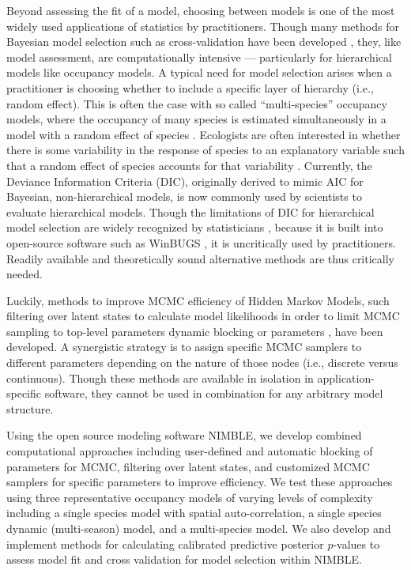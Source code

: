 \documentclass[12pt]{article}
\begin{document}
Beyond assessing the fit of a model, choosing between models is one of
the most widely used applications of statistics by
practitioners. Though many methods for Bayesian model selection such
as cross-validation have been developed \citep{hooten2014guide}, they,
like model assessment, are computationally intensive --- particularly
for hierarchical models like occupancy models. A typical need for
model selection arises when a practitioner is choosing whether to
include a specific layer of hierarchy (i.e., random effect). This is
often the case with so called ``multi-species'' occupancy models,
where the occupancy of many species is estimated simultaneously in a
model with a random effect of species \citep[reviewed in,
][]{iknayan2014detecting}. Ecologists are often interested in whether
there is some variability in the response of species to an explanatory
variable such that a random effect of species accounts for that
variability \citep{pacifici2014guidelines}. Currently, the Deviance
Information Criteria (DIC), originally derived to mimic AIC for
Bayesian, non-hierarchical models, is now commonly used by scientists
to evaluate hierarchical models. Though the limitations of DIC for
hierarchical model selection are widely recognized by statisticians
\citep{celeux2006deviance, hooten2014guide}, because it is built into
open-source software such as WinBUGS \citep{winbugs}, it is
uncritically used by practitioners. Readily available and
theoretically sound alternative methods are thus critically needed.

Luckily, methods to improve MCMC efficiency of Hidden Markov Models,
such filtering over latent states to calculate model likelihoods
in order to limit MCMC sampling to top-level parameters dynamic
blocking or parameters \citep{turek2016efficient}, have been
developed. A synergistic strategy is to assign specific MCMC samplers
to different parameters depending on the nature of those nodes (i.e.,
discrete versus continuous). Though these methods are available in
isolation in application-specific software, they cannot be used in
combination for any arbitrary model structure. 

Using the open source modeling software NIMBLE, we develop combined
computational approaches including user-defined and automatic blocking
of parameters for MCMC, filtering over latent states, and customized
MCMC samplers for specific parameters to improve efficiency. We test
these approaches using three representative occupancy models of
varying levels of complexity including a single species model with
spatial auto-correlation, a single species dynamic (multi-season)
model, and a multi-species model. We also develop and implement
methods for calculating calibrated predictive posterior $p$-values to
assess model fit and cross validation for model selection within
NIMBLE. 
\end{document}

